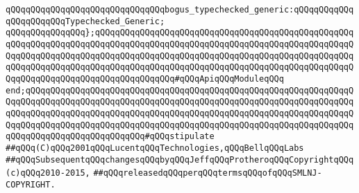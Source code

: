 \verb|qQQqqQQqqQQqqQQqqQQqqQQqqQQqqQQqbogus_typechecked_generic:qQQqqQQqqQQqqQQqqQQqqQQqTypechecked_Generic;|\newline
\verb|qQQqqQQqqQQqqQQq};qQQqqQQqqQQqqQQqqQQqqQQqqQQqqQQqqQQqqQQqqQQqqQQqqQQqqQQqqQQqqQQqqQQqqQQqqQQqqQQqqQQqqQQqqQQqqQQqqQQqqQQqqQQqqQQqqQQqqQQqqQQqqQQqqQQqqQQqqQQqqQQqqQQqqQQqqQQqqQQqqQQqqQQqqQQqqQQqqQQqqQQqqQQqqQQqqQQqqQQqqQQqqQQqqQQqqQQqqQQqqQQqqQQqqQQqqQQqqQQqqQQqqQQqqQQqqQQqqQQqqQQqqQQqqQQqqQQqqQQqqQQqqQQqqQQqqQQq#qQQqApiqQQqModuleqQQq|\newline
\verb|end;qQQqqQQqqQQqqQQqqQQqqQQqqQQqqQQqqQQqqQQqqQQqqQQqqQQqqQQqqQQqqQQqqQQqqQQqqQQqqQQqqQQqqQQqqQQqqQQqqQQqqQQqqQQqqQQqqQQqqQQqqQQqqQQqqQQqqQQqqQQqqQQqqQQqqQQqqQQqqQQqqQQqqQQqqQQqqQQqqQQqqQQqqQQqqQQqqQQqqQQqqQQqqQQqqQQqqQQqqQQqqQQqqQQqqQQqqQQqqQQqqQQqqQQqqQQqqQQqqQQqqQQqqQQqqQQqqQQqqQQqqQQqqQQqqQQqqQQqqQQqqQQq#qQQqstipulate|\newline
\newline
\newline
\verb|##qQQq(C)qQQq2001qQQqLucentqQQqTechnologies,qQQqBellqQQqLabs|\newline
\verb|##qQQqSubsequentqQQqchangesqQQqbyqQQqJeffqQQqProtheroqQQqCopyrightqQQq(c)qQQq2010-2015,|\newline
\verb|##qQQqreleasedqQQqperqQQqtermsqQQqofqQQqSMLNJ-COPYRIGHT.|\newline

